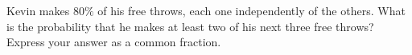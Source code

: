 Kevin makes $80\%$ of his free throws, each one independently of the others. What is the probability that he makes at least two of his next three free throws? Express your answer as a common fraction.
